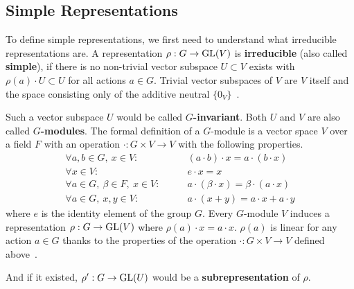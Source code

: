 \subsection{Simple Representations}

To define simple representations, we first need to understand what irreducible representations are.
A representation $\rho: G \to \operatorname{GL}(V)$ is \textbf{irreducible} (also called \textbf{simple}), if there is no non-trivial vector subspace $U \subset V$ exists with $\rho(a) \cdot U \subset U$ for all actions $a \in G$.
Trivial vector subspaces of $V$ are $V$ itself and the space consisting only of the additive neutral $\{0_V\}$~\cite{hein2013}.

Such a vector subspace $U$ would be called \textbf{$G$-invariant}.
Both $U$ and $V$ are also called \textbf{$G$-modules}.
The formal definition of a $G$-module is a vector space $V$ over a field $F$ with an operation $\cdot: G \times V \to V$ with the following properties.
\begin{subequations}
    \begin{align}
        \forall a, b \in G,\ x \in V: \qquad & (a \cdot b) \cdot x = a \cdot (b \cdot x) \\
        \forall x \in V: \qquad & e \cdot x = x \\
        \forall a \in G,\ \beta \in F,\ x \in V: \qquad & a \cdot (\beta \cdot x) = \beta \cdot (a \cdot x) \\
        \forall a \in G,\ x, y \in V: \qquad & a \cdot (x + y) = a \cdot x + a \cdot y
    \end{align}
\end{subequations}
where $e$ is the identity element of the group $G$.
Every $G$-module $V$ induces a representation $\rho: G \to \operatorname{GL}(V)$ where $\rho(a) \cdot x = a \cdot x$.
$\rho(a)$ is linear for any action $a \in G$ thanks to the properties of the operation $\cdot: G \times V \to V$ defined above~\cite{hein2013}.

And if it existed, $\rho': G \to \operatorname{GL}(U)$ would be a \textbf{subrepresentation} of $\rho$.
